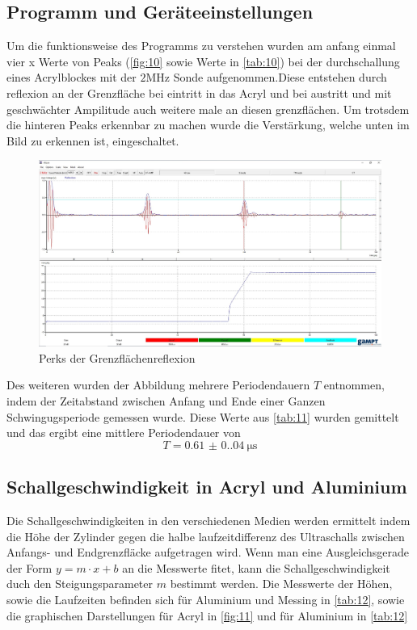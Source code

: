 \subsection{Programm und Geräteeinstellungen}
Um die funktionsweise des Programms zu verstehen wurden am anfang 
einmal vier x Werte von Peaks (\autoref{fig:10} sowie Werte in \autoref{tab:10}) bei der durchschallung eines Acrylblockes 
mit der $2 \unit{\mega\hertz}$ Sonde aufgenommen.Diese entstehen durch reflexion an der Grenzfläche 
bei eintritt in das Acryl und bei austritt und mit geschwächter Ampilitude auch weitere male 
an diesen grenzflächen. Um trotsdem die hinteren Peaks erkennbar zu machen wurde 
die Verstärkung, welche unten im Bild zu erkennen ist, eingeschaltet.
\begin{figure}[H]
    \centering
    \caption{Perks der Grenzflächenreflexion}
    \label{fig:10}
    \includegraphics[width=\textwidth]{bilder/ssprogramm.jpg}
\end{figure}
 Des weiteren wurden der Abbildung mehrere Periodendauern $T$ entnommen, indem 
 der Zeitabstand zwischen Anfang und Ende einer Ganzen Schwingugsperiode 
 gemessen wurde. Diese Werte aus \autoref{tab:11} wurden gemittelt und das ergibt eine 
 mittlere Periodendauer von 
 \begin{equation}
    T = \qty{0.61(0.04)}{\micro\second}
 \end{equation}

 \subsection{Schallgeschwindigkeit in Acryl und Aluminium}
 Die Schallgeschwindigkeiten in den verschiedenen Medien werden ermittelt indem 
 die Höhe der Zylinder gegen die halbe laufzeitdifferenz des Ultraschalls zwischen 
 Anfangs- und Endgrenzfläcke aufgetragen wird. Wenn man eine Ausgleichsgerade der Form 
 $y = m \cdot x + b$ an die Messwerte fitet, kann die Schallgeschwindigkeit 
 duch den Steigungsparameter $m$ bestimmt werden. Die Messwerte der Höhen, sowie die Laufzeiten 
 befinden sich für Aluminium und Messing in \autoref{tab:12}, sowie die graphischen Darstellungen für 
 Acryl in \autoref{fig:11} und für Aluminium in \autoref{tab:12}
 
